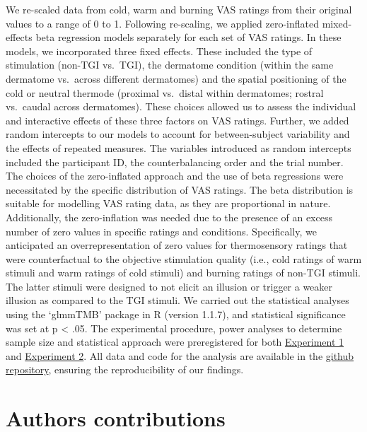 \documentclass[
]{article}
\begin{document}
We re-scaled data from cold, warm and burning VAS ratings from their
original values to a range of 0 to 1. Following re-scaling, we applied
zero-inflated mixed-effects beta regression models separately for each
set of VAS ratings. In these models, we incorporated three fixed
effects. These included the type of stimulation (non-TGI vs.~TGI), the
dermatome condition (within the same dermatome vs.~across different
dermatomes) and the spatial positioning of the cold or neutral thermode
(proximal vs.~distal within dermatomes; rostral vs.~caudal across
dermatomes). These choices allowed us to assess the individual and
interactive effects of these three factors on VAS ratings. Further, we
added random intercepts to our models to account for between-subject
variability and the effects of repeated measures. The variables
introduced as random intercepts included the participant ID, the
counterbalancing order and the trial number. The choices of the
zero-inflated approach and the use of beta regressions were necessitated
by the specific distribution of VAS ratings. The beta distribution is
suitable for modelling VAS rating data, as they are proportional in
nature. Additionally, the zero-inflation was needed due to the presence
of an excess number of zero values in specific ratings and conditions.
Specifically, we anticipated an overrepresentation of zero values for
thermosensory ratings that were counterfactual to the objective
stimulation quality (i.e., cold ratings of warm stimuli and warm ratings
of cold stimuli) and burning ratings of non-TGI stimuli. The latter
stimuli were designed to not elicit an illusion or trigger a weaker
illusion as compared to the TGI stimuli. We carried out the statistical
analyses using the `glmmTMB' package in R (version 1.1.7), and
statistical significance was set at p \textless{} .05. The experimental
procedure, power analyses to determine sample size and statistical
approach were preregistered for both
\href{https://osf.io/4xcn5/}{Experiment 1} and
\href{https://osf.io/dhg8u/}{Experiment 2}. All data and code for the
analysis are available in the
\href{https://github.com/Body-Pain-Perception-Lab/tgi-spinal/tree/Markdown-manuscript}{github
repository}, ensuring the reproducibility of our findings.

\newpage

\hypertarget{authors-contributions}{%
\section{Authors contributions}\label{authors-contributions}}
\end{document}
